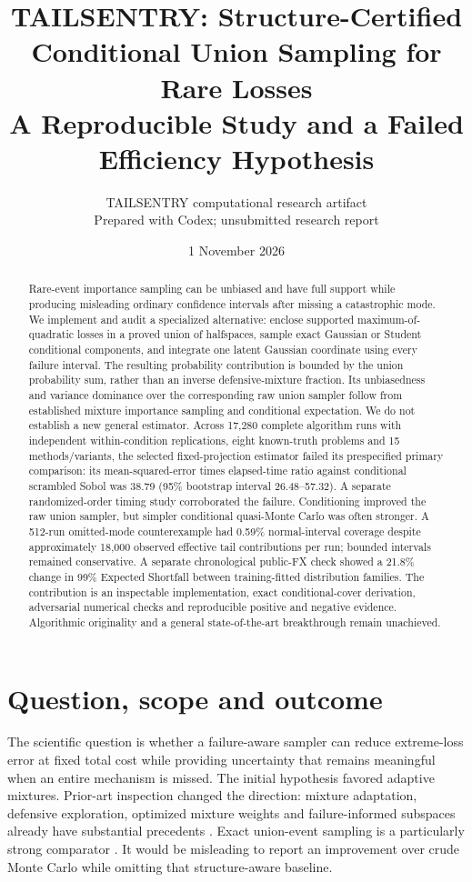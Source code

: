 \documentclass[11pt]{article}
\title{TAILSENTRY: Structure-Certified Conditional Union Sampling for Rare Losses\\[5pt]\large A Reproducible Study and a Failed Efficiency Hypothesis}
\author{TAILSENTRY computational research artifact\\\small Prepared with Codex; unsubmitted research report}
\date{1 November 2026}
\begin{document}
\maketitle
\begin{abstract}
Rare-event importance sampling can be unbiased and have full support while producing misleading ordinary confidence intervals after missing a catastrophic mode. We implement and audit a specialized alternative: enclose supported maximum-of-quadratic losses in a proved union of halfspaces, sample exact Gaussian or Student conditional components, and integrate one latent Gaussian coordinate using every failure interval. The resulting probability contribution is bounded by the union probability sum, rather than an inverse defensive-mixture fraction. Its unbiasedness and variance dominance over the corresponding raw union sampler follow from established mixture importance sampling and conditional expectation. We do not establish a new general estimator. Across 17,280 complete algorithm runs with independent within-condition replications, eight known-truth problems and 15 methods/variants, the selected fixed-projection estimator failed its prespecified primary comparison: its mean-squared-error times elapsed-time ratio against conditional scrambled Sobol was 38.79 (95\% bootstrap interval 26.48--57.32). A separate randomized-order timing study corroborated the failure. Conditioning improved the raw union sampler, but simpler conditional quasi-Monte Carlo was often stronger. A 512-run omitted-mode counterexample had 0.59\% normal-interval coverage despite approximately 18,000 observed effective tail contributions per run; bounded intervals remained conservative. A separate chronological public-FX check showed a 21.8\% change in 99\% Expected Shortfall between training-fitted distribution families. The contribution is an inspectable implementation, exact conditional-cover derivation, adversarial numerical checks and reproducible positive and negative evidence. Algorithmic originality and a general state-of-the-art breakthrough remain unachieved.
\end{abstract}

\section{Question, scope and outcome}
The scientific question is whether a failure-aware sampler can reduce extreme-loss error at fixed total cost while providing uncertainty that remains meaningful when an entire mechanism is missed. The initial hypothesis favored adaptive mixtures. Prior-art inspection changed the direction: mixture adaptation, defensive exploration, optimized mixture weights and failure-informed subspaces already have substantial precedents \citep{he2014,uribe2021,tong2023,helal2025}. Exact union-event sampling is a particularly strong comparator \citep{owen2019aloe}. It would be misleading to report an improvement over crude Monte Carlo while omitting that structure-aware baseline.
\end{document}
